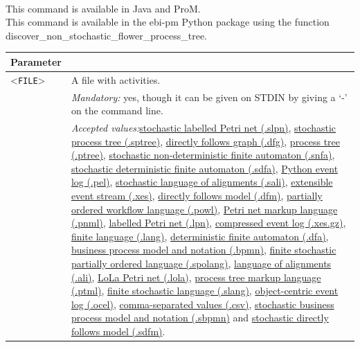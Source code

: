 {\\This command is available in Java and ProM.
\\This command is available in the ebi-pm Python package using the function discover\_non\_stochastic\_flower\_process\_tree.
\begin{tabularx}{\linewidth}{lX}
\toprule
Parameter \\\midrule
<\texttt{FILE}>&A file with activities.\\
&\textit{Mandatory:} \quad yes, though it can be given on STDIN by giving a `-' on the command line.\\
&\textit{Accepted values:}\quad \hyperref[filehandler:stochastic labelled Petri net]{stochastic labelled Petri net (.slpn)}, \hyperref[filehandler:stochastic process tree]{stochastic process tree (.sptree)}, \hyperref[filehandler:directly follows graph]{directly follows graph (.dfg)}, \hyperref[filehandler:process tree]{process tree (.ptree)}, \hyperref[filehandler:stochastic non-deterministic finite automaton]{stochastic non-deterministic finite automaton (.snfa)}, \hyperref[filehandler:stochastic deterministic finite automaton]{stochastic deterministic finite automaton (.sdfa)}, \hyperref[filehandler:Python event log]{Python event log (.pel)}, \hyperref[filehandler:stochastic language of alignments]{stochastic language of alignments (.sali)}, \hyperref[filehandler:extensible event stream]{extensible event stream (.xes)}, \hyperref[filehandler:directly follows model]{directly follows model (.dfm)}, \hyperref[filehandler:partially ordered workflow language]{partially ordered workflow language (.powl)}, \hyperref[filehandler:Petri net markup language]{Petri net markup language (.pnml)}, \hyperref[filehandler:labelled Petri net]{labelled Petri net (.lpn)}, \hyperref[filehandler:compressed event log]{compressed event log (.xes.gz)}, \hyperref[filehandler:finite language]{finite language (.lang)}, \hyperref[filehandler:deterministic finite automaton]{deterministic finite automaton (.dfa)}, \hyperref[filehandler:business process model and notation]{business process model and notation (.bpmn)}, \hyperref[filehandler:finite stochastic partially ordered language]{finite stochastic partially ordered language (.spolang)}, \hyperref[filehandler:language of alignments]{language of alignments (.ali)}, \hyperref[filehandler:LoLa Petri net]{LoLa Petri net (.lola)}, \hyperref[filehandler:process tree markup language]{process tree markup language (.ptml)}, \hyperref[filehandler:finite stochastic language]{finite stochastic language (.slang)}, \hyperref[filehandler:object-centric event log]{object-centric event log (.ocel)}, \hyperref[filehandler:comma-separated values]{comma-separated values (.csv)}, \hyperref[filehandler:stochastic business process model and notation]{stochastic business process model and notation (.sbpmn)} and \hyperref[filehandler:stochastic directly follows model]{stochastic directly follows model (.sdfm)}.\\

\end{tabularx}}
